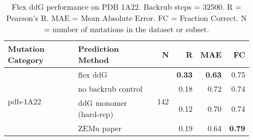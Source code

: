 \begin{table}
  \begin{tabular}{llrrrr}
\toprule
Mutation Category &       Prediction Method &    N &    R &  MAE &   FC \\
\midrule
 \multirow{ 4}{*}{pdb-1A22} & flex ddG & \multirow{ 4}{*}{142} & \textbf{0.33} & \textbf{0.63} & 0.75  \\
 & no backrub control & & 0.18 & 0.72 & 0.74  \\
 & ddG monomer (hard-rep) & & 0.12 & 0.70 & 0.74  \\
 & ZEMu paper & & 0.19 & 0.64 & \textbf{0.79}  \\
\bottomrule
\end{tabular}
  \caption[Flex ddG performance on PDB 1A22]{
    Flex ddG performance on PDB 1A22. Backrub steps = 32500. R = Pearson's R. MAE = Mean Absolute Error. FC = Fraction Correct. N = number of mutations in the dataset or subset.
  } \label{tab:table-pdb-1A22}
\end{table}
